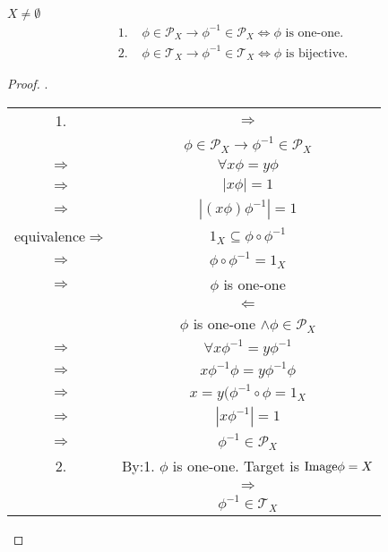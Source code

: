 \begin{Prop}
    $X\neq \emptyset$
    \begin{align*}
        \text{1. } & \phi \in \mathcal{P}_X \rightarrow \phi^{-1} \in \mathcal{P}_X \Leftrightarrow \phi \text{ is one-one.}    \\
        \text{2. } & \phi \in \mathcal{T}_X \rightarrow \phi^{-1} \in \mathcal{T}_X \Leftrightarrow \phi \text{ is bijective.}  
    \end{align*}

    \begin{proof}.
        \begin{center}
            \begin{tabular}{c c}
                1. & $\Rightarrow$  \\
                & $\phi\in \mathcal{P}_X \rightarrow \phi^{-1} \in \mathcal{P}_X$   \\
                $\Rightarrow$ & $\forall x\phi = y\phi$     \\
                $\Rightarrow$ & $|x\phi| = 1$              \\ 
                $\Rightarrow$ & $|(x\phi)\phi^{-1}| = 1$    \\
                equivalence$\Rightarrow$ & $1_X \subseteq \phi \circ \phi^{-1}$      \\
                $\Rightarrow$ & $\phi \circ \phi^{-1} = 1_X$    \\
                $\Rightarrow$ & $\phi$ is one-one   \\
                & $\Leftarrow$  \\
                & $\phi$ is one-one $\wedge \phi \in \mathcal{P}_X$ \\
                $\Rightarrow$ & $\forall x\phi^{-1} = y\phi^{-1}$   \\
                $\Rightarrow$ & $x\phi^{-1}\phi = y\phi^{-1}\phi$   \\
                $\Rightarrow$ & $x = y (\phi^{-1} \circ \phi = 1_X $                             \\
                $\Rightarrow$ & $|x\phi^{-1}| = 1$  \\
                $\Rightarrow$ & $\phi^{-1} \in \mathcal{P}_X$   \\
                2. & By:1. $\phi$ is one-one. Target is $\mathrm{Image} \phi = X$   \\
                &  $\Rightarrow$    \\
                & $\phi^{-1} \in \mathcal{T}_X$ \\

\end{tabular}
\end{center}
\end{proof}
\end{Prop}

